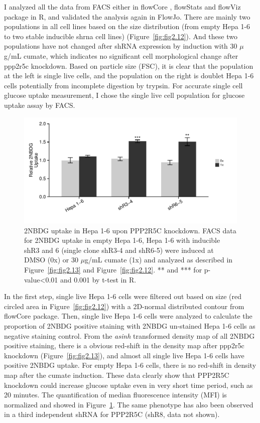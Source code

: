 I analyzed all the data from FACS either in flowCore \cite{ellis_flowcore:_????}, flowStats \cite{hahne_flowstats:_????} and flowViz \cite{ellis_flowviz:_????} package in R, and validated the analysis again in FlowJo. There are mainly two populations in all cell lines  based on the size distribution (from empty Hepa 1-6 to two stable inducible \gls{shrna} cell lines) (Figure~\ref{fig:fig2.12}). And these two populations have not changed after shRNA expression by induction with 30 $\mu$g/mL cumate, which indicates no significant cell morphological change after \gls{ppp2r5c} knockdown. Based on particle size (FSC), it is clear that the population at the left is single live cells, and the population on the right is doublet Hepa 1-6 cells potentially from incomplete digestion by trypsin. For accurate single cell glucose uptake measurement, I chose the single live cell population for glucose uptake assay by FACS.

\begin{figure}[htbp]
\centering
\includegraphics[width=1\textwidth]{figs/fig2-14 facs glucose uptake.pdf}
\caption[Relative quantification of 2NBDG uptake upon PPP2R5C KD]{\footnotesize 2NBDG uptake in Hepa 1-6 upon PPP2R5C knockdown. FACS data for 2NBDG uptake in empty Hepa 1-6, Hepa 1-6 with inducible shR3 and 6 (single clone shR3-4 and shR6-5) were induced at DMSO (0x) or 30 $\mu$g/mL cumate (1x) and analyzed as described in Figure~\ref{fig:fig2.13} and Figure~\ref{fig:fig2.12}. ** and *** for p-value<0.01 and 0.001 by t-test in R. }
\label{fig:fig2.14}
\end{figure}

In the first step, single live Hepa 1-6 cells were filtered out based on size (red circled area in Figure~\ref{fig:fig2.12}) with a 2D-normal distributed contour from flowCore package. Then, single live Hepa 1-6 cells were analyzed to calculate the proportion of 2NBDG positive staining with 2NBDG un-stained Hepa 1-6 cells as negative staining control. From the \textit{asinh} transformed density map of all 2NBDG positive staining, there is a obvious red-shift in the density map after \gls{ppp2r5c} knockdown (Figure~\ref{fig:fig2.13}), and almost all single live Hepa 1-6 cells have positive 2NBDG uptake. For empty Hepa 1-6 cells, there is no red-shift in density map after the cumate induction. These data clearly show that PPP2R5C knockdown could increase glucose uptake even in very short time period, such as 20 minutes. The quantification of median fluorescence intensity (MFI) is normalized and showed in Figure~\ref{fig:fig2.14}. The same phenotype has also been observed in a third independent shRNA for PPP2R5C (shR8, data not shown). 

